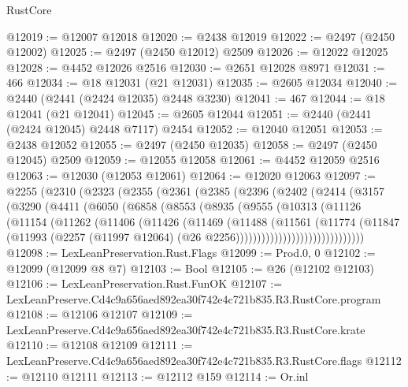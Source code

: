 \begin{lexlean}{RustCore}
\begin{coremodule}
@12019 := @12007 @12018
@12020 := @2438 @12019
@12022 := @2497 (@2450 @12002)
@12025 := @2497 (@2450 @12012) @2509
@12026 := @12022 @12025
@12028 := @4452 @12026 @2516
@12030 := @2651 @12028 @8971
@12031 := 466
@12034 := @18 @12031 (@21 @12031)
@12035 := @2605 @12034
@12040 := @2440 (@2441 (@2424 @12035) @2448 @3230)
@12041 := 467
@12044 := @18 @12041 (@21 @12041)
@12045 := @2605 @12044
@12051 := @2440 (@2441 (@2424 @12045) @2448 @7117) @2454
@12052 := @12040 @12051
@12053 := @2438 @12052
@12055 := @2497 (@2450 @12035)
@12058 := @2497 (@2450 @12045) @2509
@12059 := @12055 @12058
@12061 := @4452 @12059 @2516
@12063 := @12030 (@12053 @12061)
@12064 := @12020 @12063
@12097 := @2255
    (@2310
      (@2323
        (@2355
          (@2361
            (@2385
              (@2396
                (@2402
                  (@2414
                    (@3157
                      (@3290
                        (@4411
                          (@6050
                            (@6858
                              (@8553
                                (@8935
                                  (@9555
                                    (@10313
                                      (@11126
                                        (@11154
                                          (@11262
                                            (@11406
                                              (@11426
                                                (@11469
                                                  (@11488
                                                    (@11561
                                                      (@11774
                                                        (@11847
                                                          (@11993
                                                            (@2257
                                                              (@11997 @12064)
                                                              (@26
                                                                @2256))))))))))))))))))))))))))))))
@12098 := LexLeanPreservation.Rust.Flags
@12099 := Prod.{0, 0}
@12102 := @12099 (@12099 @8 @7)
@12103 := Bool
@12105 := @26 (@12102 @12103)
@12106 := LexLeanPreservation.Rust.FunOK
@12107 := LexLeanPreserve.Cd4c9a656aed892ea30f742e4c721b835.R3.RustCore.program
@12108 := @12106 @12107
@12109 := LexLeanPreserve.Cd4c9a656aed892ea30f742e4c721b835.R3.RustCore.krate
@12110 := @12108 @12109
@12111 := LexLeanPreserve.Cd4c9a656aed892ea30f742e4c721b835.R3.RustCore.flags
@12112 := @12110 @12111
@12113 := @12112 @159
@12114 := Or.inl

\end{coremodule}
\end{lexlean}
